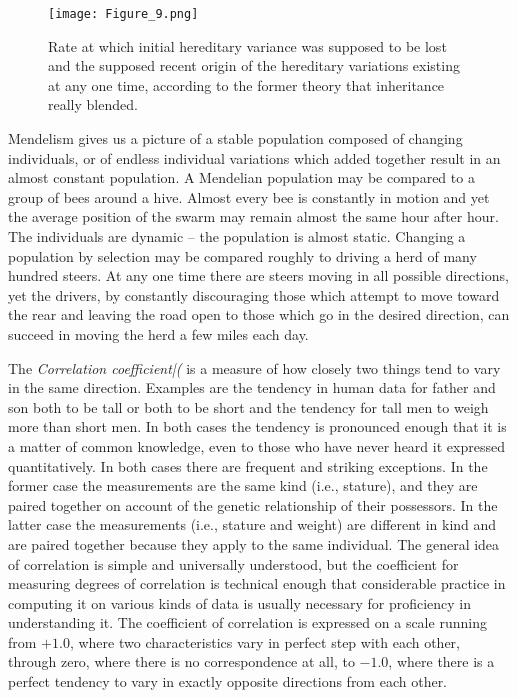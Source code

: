 {\begin{figure}
    \texttt{[image: Figure\_9.png]}
    \caption{Rate at which initial hereditary variance was supposed to be lost and the
			 supposed recent origin of the hereditary variations existing at any one time,
			 according to the former theory that inheritance really blended.}
    \label{fig:Lush_Figure_9}
\end{figure}

Mendelism gives us a picture of a stable population composed of
changing individuals, or of endless individual variations which added
together result in an almost constant population. A Mendelian population
may be compared to a group of bees around a hive. Almost every
bee is constantly in motion and yet the average position of the swarm
may remain almost the same hour after hour. The individuals are
dynamic -- the population is almost static. Changing a population by
selection may be compared roughly to driving a herd of many hundred
steers. At any one time there are steers moving in all possible directions,
yet the drivers, by constantly discouraging those which attempt to move
toward the rear and leaving the road open to those which go in the
desired direction, can succeed in moving the herd a few miles each day.

The \textit{Correlation coefficient|(} is a measure of how closely two things
tend to vary in the same direction. Examples are the tendency in human
data for father and son both to be tall or both to be short and the tendency
for tall men to weigh more than short men. In both cases the
tendency is pronounced enough that it is a matter of common knowledge,
even to those who have never heard it expressed quantitatively. In
both cases there are frequent and striking exceptions. In the former
case the measurements are the same kind (i.e., stature), and they are
paired together on account of the genetic relationship of their possessors.
In the latter case the measurements (i.e., stature and weight) are
different in kind and are paired together because they apply to the same
individual. The general idea of correlation is simple and universally
understood, but the coefficient for measuring degrees of correlation is
technical enough that considerable practice in computing it on
various kinds of data is usually necessary for proficiency in understanding
it. The coefficient of correlation is expressed on a scale running
from $+1.0$, where two characteristics vary in perfect step with each
other, through zero, where there is no correspondence at all, to $-1.0$,
where there is a perfect tendency to vary in exactly opposite directions
from each other.

}
